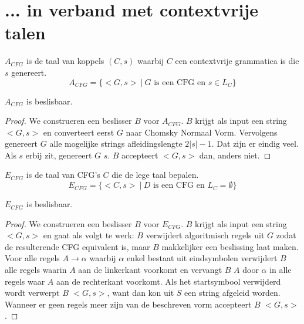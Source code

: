 \documentclass[main.tex]{subfiles}
\begin{document}
\section{... in verband met contextvrije talen}
\label{sec:verb-met-cont}

\begin{de}
  \label{de:a-cfg}
  $A_{CFG}$ is de taal van koppels $(C,s)$ waarbij $C$ een contextvrije grammatica is die $s$ genereert.
  \[ A_{CFG} = \{ <G,s> \ |\ G \text{ is een CFG en } s \in L_{C} \} \]
\end{de}

\begin{st}
  \label{st:a-cfg-besl}
  $A_{CFG}$ is beslisbaar.

  \begin{proof}
    We construeren een beslisser $B$ voor $A_{CFG}$.
    $B$ krijgt als input een string $<G,s>$ en converteert eerst $G$ naar Chomsky Normaal Vorm.
    Vervolgens genereert $G$ alle mogelijke strings afleidingslengte $2|s| - 1$.
    Dat zijn er eindig veel.
    Als $s$ erbij zit, genereert $G$ $s$.
    $B$ accepteert $<G,s>$ dan, anders niet.
  \end{proof}
\end{st}

\begin{de}
  \label{de:e-cfg}
  $E_{CFG}$ is de taal van CFG's $C$ die de lege taal bepalen.
  \[ E_{CFG} = \{ <C,s>\ |\ D \text{ is een CFG en } L_{C} = \emptyset \} \]
\end{de}

\begin{st}
  \label{st:e-cfg-besl}
  $E_{CFG}$ is beslisbaar.

  \begin{proof}
    We construeren een beslisser $B$ voor $E_{CFG}$.
    $B$ krijgt als input een string $<G,s>$ en gaat als volgt te werk:
    $B$ verwijdert algoritmisch regels uit $G$ zodat de resulterende CFG equivalent is, maar $B$ makkelijker een beslissing laat maken.
    Voor alle regels $A \rightarrow \alpha$ waarbij $\alpha$ enkel bestaat uit eindsymbolen verwijdert $B$ alle regels waarin $A$ aan de linkerkant voorkomt en vervangt $B$ $A$ door $\alpha$ in alle regels waar $A$ aan de rechterkant voorkomt.
    Als het startsymbool verwijderd wordt verwerpt $B$ $<G,s>$, want dan kon uit $S$ een string afgeleid worden.
    Wanneer er geen regels meer zijn van de beschreven vorm accepteert $B$ $<G,s>$.
  \end{proof}
\end{st}
\end{document}
